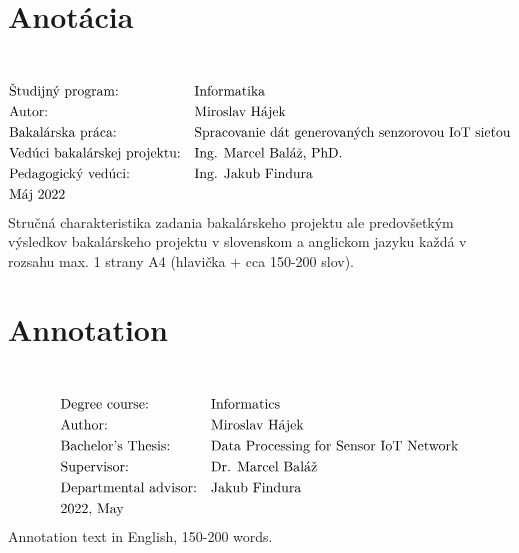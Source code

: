 \thispagestyle{empty}
\section*{Anotácia}
\University \\
\uppercase{\Faculty}
\vspace{-8pt}
{\setlength{\mathindent}{0cm}
\begin{align*}
&\text{Študijný program:} && \text{\StudyProgramme} \\
&\text{Autor:} && \text{\Author} \\
&\text{\Thesis:} && \text{\Title} \\
&\text{Vedúci bakalárskej projektu:} && \text{\Supervisor} \\
&\text{Pedagogický vedúci:} && \text{\PedagogicalSupervisor} \\
&\text{\Date}
\end{align*}}
Stručná charakteristika zadania bakalárskeho projektu ale predovšetkým výsledkov bakalárskeho projektu v slovenskom a anglickom jazyku každá v rozsahu max. 1 strany A4 (hlavička + cca 150-200 slov).
\emptypage

\thispagestyle{empty}
\section*{Annotation}
\UniversityEN \\
\uppercase{\FacultyEN}
\vspace{-8pt}
{\setlength{\mathindent}{0cm}
\begin{align*}
&\text{Degree course:} && \text{\StudyProgrammeEN} \\
&\text{Author:} && \text{\Author} \\
&\text{\ThesisEN:} && \text{\TitleEN} \\
&\text{Supervisor:} && \text{\SupervisorEN} \\
&\text{Departmental advisor:} && \text{\PedagogicalSupervisorEN} \\
&\text{\DateEN}
\end{align*}}
Annotation text in English, 150-200 words.
\emptypage 
